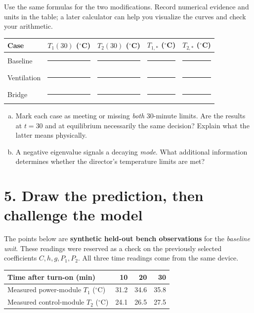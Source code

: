 \documentclass[10pt,letterpaper]{article}
\newcommand{\work}[1]{\vspace{#1}}
\begin{document}
Use the same formulas for the two modifications. Record numerical evidence and units in the table; a later calculator can help you visualize the curves and check your arithmetic.
\begin{center}
\begin{tabular}{@{}lcccc@{}}
\toprule
Case & $T_1(30)$ ($^\circ$C) & $T_2(30)$ ($^\circ$C) & $T_{1,*}$ ($^\circ$C) & $T_{2,*}$ ($^\circ$C)\\
\midrule
Baseline & \rule{.70in}{.4pt} & \rule{.70in}{.4pt} & \rule{.70in}{.4pt} & \rule{.70in}{.4pt}\\[8pt]
Ventilation & \rule{.70in}{.4pt} & \rule{.70in}{.4pt} & \rule{.70in}{.4pt} & \rule{.70in}{.4pt}\\[8pt]
Bridge & \rule{.70in}{.4pt} & \rule{.70in}{.4pt} & \rule{.70in}{.4pt} & \rule{.70in}{.4pt}\\
\bottomrule
\end{tabular}
\end{center}

\begin{enumerate}[c.,leftmargin=*]
\item Mark each case as meeting or missing \emph{both} 30-minute limits. Are the results at $t=30$ and at equilibrium necessarily the same decision? Explain what the latter means physically.\work{0.47in}
\item A negative eigenvalue signals a decaying \emph{mode}. What additional information determines whether the director's temperature limits are met?\work{0.41in}
\end{enumerate}

\newpage
\section*{5. Draw the prediction, then challenge the model}
The points below are \textbf{synthetic held-out bench observations} for the \emph{baseline unit}. These readings were reserved as a check on the previously selected coefficients $C,h,g,P_1,P_2$. All three time readings come from the same device.
\begin{center}
\begin{tabular}{@{}lrrr@{}}
\toprule
Time after turn-on (min) & 10 & 20 & 30\\
\midrule
Measured power-module $T_1$ ($^\circ$C) & 31.2 & 34.6 & 35.8\\
Measured control-module $T_2$ ($^\circ$C) & 24.1 & 26.5 & 27.5\\
\bottomrule
\end{tabular}
\end{center}
\end{document}
